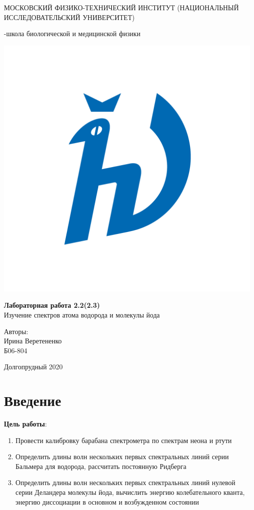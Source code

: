 \documentclass[a4paper,12pt]{article} %
\begin{document}
\begin{titlepage}
\begin{center}
    {\large МОСКОВСКИЙ ФИЗИКО-ТЕХНИЧЕСКИЙ ИНСТИТУТ (НАЦИОНАЛЬНЫЙ ИССЛЕДОВАТЕЛЬСКИЙ УНИВЕРСИТЕТ)}
\end{center}
\begin{center}
    {-школа биологической и медицинской физики}
\end{center}


    \vspace{3.5cm}

\begin{center}
    \includegraphics[width=0.4\linewidth]{hv_full.png}
\end{center}
\vspace{0.1cm}
{\huge
\begin{center}
    {\bf Лабораторная работа 2.2(2.3)}\\
    Изучение спектров атома водорода и молекулы йода
\end{center}
}
\vspace{2cm}
\begin{flushright}
{\LARGE Авторы:\\ Ирина Веретененко \\
\vspace{0.2cm}
Б06-804}
\end{flushright}
\vspace{3.5cm}
\begin{center}
    Долгопрудный 2020
\end{center}
\end{titlepage}

\section*{Введение}

\textbf{Цель работы}: 
\begin{enumerate}
    \item Провести калибровку барабана спектрометра по спектрам неона и ртути
    \item Определить длины волн нескольких первых спектральных линий серии Бальмера для водорода, рассчитать постоянную Ридберга
    \item Определить длины волн нескольких первых спектральных линий нулевой серии Деландера молекулы йода, вычислить энергию колебательного кванта, энергию диссоциации в основном и возбужденном состоянии 
\end{enumerate}
\end{document}
